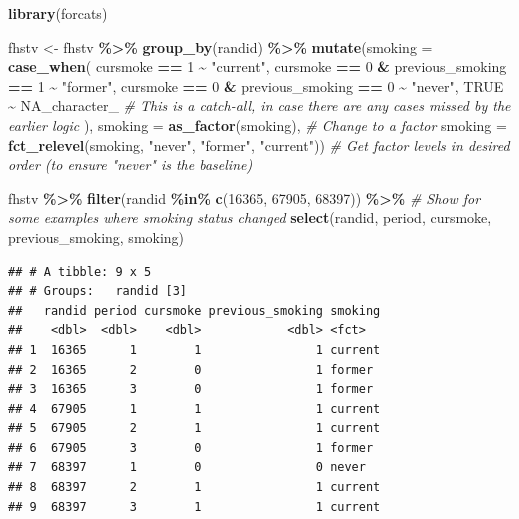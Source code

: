 \documentclass[
]{book}
\newenvironment{Shaded}{\begin{snugshade}}{\end{snugshade}}
\newcommand{\AttributeTok}[1]{\textcolor[rgb]{0.13,0.29,0.53}{#1}}
\newcommand{\CommentTok}[1]{\textcolor[rgb]{0.56,0.35,0.01}{\textit{#1}}}
\newcommand{\ConstantTok}[1]{\textcolor[rgb]{0.56,0.35,0.01}{#1}}
\newcommand{\DecValTok}[1]{\textcolor[rgb]{0.00,0.00,0.81}{#1}}
\newcommand{\FunctionTok}[1]{\textcolor[rgb]{0.13,0.29,0.53}{\textbf{#1}}}
\newcommand{\NormalTok}[1]{#1}
\newcommand{\OtherTok}[1]{\textcolor[rgb]{0.56,0.35,0.01}{#1}}
\newcommand{\SpecialCharTok}[1]{\textcolor[rgb]{0.81,0.36,0.00}{\textbf{#1}}}
\newcommand{\StringTok}[1]{\textcolor[rgb]{0.31,0.60,0.02}{#1}}
\begin{document}
\begin{Shaded}
\begin{Highlighting}[]
\FunctionTok{library}\NormalTok{(forcats)}

\NormalTok{fhstv }\OtherTok{\textless{}{-}}\NormalTok{ fhstv }\SpecialCharTok{\%\textgreater{}\%} 
  \FunctionTok{group\_by}\NormalTok{(randid) }\SpecialCharTok{\%\textgreater{}\%} 
  \FunctionTok{mutate}\NormalTok{(}\AttributeTok{smoking =} \FunctionTok{case\_when}\NormalTok{(}
\NormalTok{    cursmoke }\SpecialCharTok{==} \DecValTok{1} \SpecialCharTok{\textasciitilde{}} \StringTok{"current"}\NormalTok{, }
\NormalTok{    cursmoke }\SpecialCharTok{==} \DecValTok{0} \SpecialCharTok{\&}\NormalTok{ previous\_smoking }\SpecialCharTok{==} \DecValTok{1} \SpecialCharTok{\textasciitilde{}} \StringTok{"former"}\NormalTok{,}
\NormalTok{    cursmoke }\SpecialCharTok{==} \DecValTok{0} \SpecialCharTok{\&}\NormalTok{ previous\_smoking }\SpecialCharTok{==} \DecValTok{0} \SpecialCharTok{\textasciitilde{}} \StringTok{"never"}\NormalTok{, }
    \ConstantTok{TRUE} \SpecialCharTok{\textasciitilde{}} \ConstantTok{NA\_character\_} \CommentTok{\# This is a catch{-}all, in case there are any cases missed by the earlier logic}
\NormalTok{                             ),}
    \AttributeTok{smoking =} \FunctionTok{as\_factor}\NormalTok{(smoking),  }\CommentTok{\# Change to a factor}
    \AttributeTok{smoking =} \FunctionTok{fct\_relevel}\NormalTok{(smoking, }\StringTok{"never"}\NormalTok{, }\StringTok{"former"}\NormalTok{, }\StringTok{"current"}\NormalTok{)) }\CommentTok{\# Get factor levels in desired order (to ensure "never" is the baseline)}

\NormalTok{fhstv }\SpecialCharTok{\%\textgreater{}\%} 
  \FunctionTok{filter}\NormalTok{(randid }\SpecialCharTok{\%in\%} \FunctionTok{c}\NormalTok{(}\DecValTok{16365}\NormalTok{, }\DecValTok{67905}\NormalTok{, }\DecValTok{68397}\NormalTok{)) }\SpecialCharTok{\%\textgreater{}\%} \CommentTok{\# Show for some examples where smoking status changed}
  \FunctionTok{select}\NormalTok{(randid, period, cursmoke, previous\_smoking, smoking)}
\end{Highlighting}
\end{Shaded}

\begin{verbatim}
## # A tibble: 9 x 5
## # Groups:   randid [3]
##   randid period cursmoke previous_smoking smoking
##    <dbl>  <dbl>    <dbl>            <dbl> <fct>  
## 1  16365      1        1                1 current
## 2  16365      2        0                1 former 
## 3  16365      3        0                1 former 
## 4  67905      1        1                1 current
## 5  67905      2        1                1 current
## 6  67905      3        0                1 former 
## 7  68397      1        0                0 never  
## 8  68397      2        1                1 current
## 9  68397      3        1                1 current
\end{verbatim}
\end{document}
